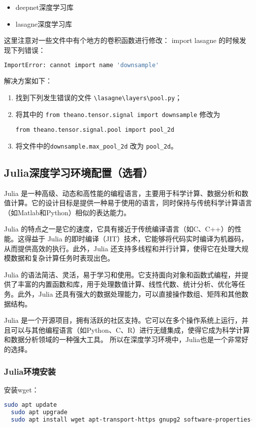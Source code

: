 \documentclass[lang=cn,a4paper,newtx]{elegantpaper}
\begin{document}
\begin{itemize}
  \item deepnet深度学习库
  \item lasagne深度学习库
\end{itemize}

这里注意对一些文件中有个地方的卷积函数进行修改：
import lasagne 的时候发现下列错误：
\begin{lstlisting}[language=bash]
  ImportError: cannot import name 'downsample'
\end{lstlisting}

解决方案如下：
\begin{enumerate}[label=\arabic*). ]
  \item 找到下列发生错误的文件 \verb|\lasagne\layers\pool.py|；
  \item 将其中的 \verb|from theano.tensor.signal import downsample| 修改为
	
  \verb|from theano.tensor.signal.pool import pool_2d|
  \item 将文件中的\verb|downsample.max_pool_2d| 改为  \verb|pool_2d|。
\end{enumerate}

\subsection{Julia深度学习环境配置（选看）}
Julia 是一种高级、动态和高性能的编程语言，主要用于科学计算、数据分析和数值计算。它的设计目标是提供一种易于使用的语言，同时保持与传统科学计算语言（如Matlab和Python）相似的表达能力。

Julia 的特点之一是它的速度，它具有接近于传统编译语言（如C、C++）的性能。这得益于 Julia 的即时编译（JIT）技术，它能够将代码实时编译为机器码，从而提供高效的执行。此外，Julia 还支持多线程和并行计算，使得它在处理大规模数据和复杂计算任务时表现出色。

Julia 的语法简洁、灵活，易于学习和使用。它支持面向对象和函数式编程，并提供了丰富的内置函数和库，用于处理数值计算、线性代数、统计分析、优化等任务。此外，Julia 还具有强大的数据处理能力，可以直接操作数组、矩阵和其他数据结构。

Julia 是一个开源项目，拥有活跃的社区支持。它可以在多个操作系统上运行，并且可以与其他编程语言（如Python、C、R）进行无缝集成，使得它成为科学计算和数据分析领域的一种强大工具。
所以在深度学习环境中，Julia也是一个非常好的选择。
\subsubsection{Julia环境安装}
安装wget：
\begin{lstlisting}[language=bash]
  sudo apt update
  sudo apt upgrade
  sudo apt install wget apt-transport-https gnupg2 software-properties-common
\end{lstlisting}
\end{document}
